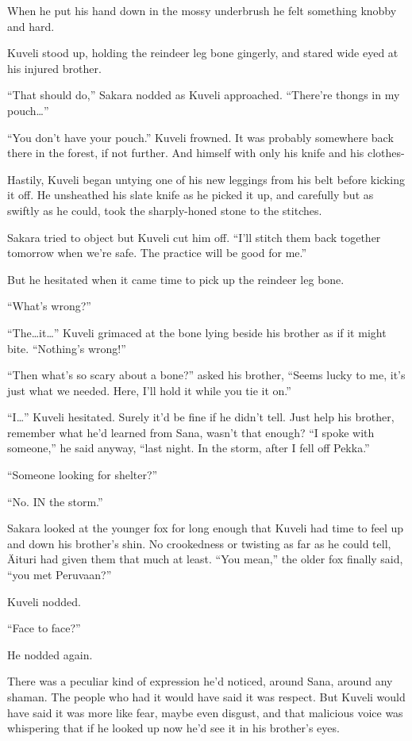 When he put his hand down in the mossy underbrush he felt something knobby and hard.

Kuveli stood up, holding the reindeer leg bone gingerly, and stared wide eyed at his injured brother.

``That should do,'' Sakara nodded as Kuveli approached. ``There're thongs in my pouch\ldots''

``You don't have your pouch.'' Kuveli frowned. It was probably somewhere back there in the forest, if not further. And himself with only his knife and his clothes-

Hastily, Kuveli began untying one of his new leggings from his belt before kicking it off. He unsheathed his slate knife as he picked it up, and carefully but as swiftly as he could, took the sharply-honed stone to the stitches.

Sakara tried to object but Kuveli cut him off. ``I'll stitch them back together tomorrow when we're safe. The practice will be good for me.''

But he hesitated when it came time to pick up the reindeer leg bone.

``What's wrong?''

``The\ldots{}it\ldots'' Kuveli grimaced at the bone lying beside his brother as if it might bite. ``Nothing's wrong!''

``Then what's so scary about a bone?'' asked his brother, ``Seems lucky to me, it's just what we needed. Here, I'll hold it while you tie it on.''

``I\ldots'' Kuveli hesitated. Surely it'd be fine if he didn't tell. Just help his brother, remember what he'd learned from Sana, wasn't that enough? ``I spoke with someone,'' he said anyway, ``last night. In the storm, after I fell off Pekka.''

``Someone looking for shelter?''

``No. IN the storm.''

Sakara looked at the younger fox for long enough that Kuveli had time to feel up and down his brother's shin. No crookedness or twisting as far as he could tell, Äituri had given them that much at least. ``You mean,'' the older fox finally said, ``you met Peruvaan?''

Kuveli nodded.

``Face to face?''

He nodded again.

There was a peculiar kind of expression he'd noticed, around Sana, around any shaman. The people who had it would have said it was respect. But Kuveli would have said it was more like fear, maybe even disgust, and that malicious voice was whispering that if he looked up now he'd see it in his brother's eyes.

